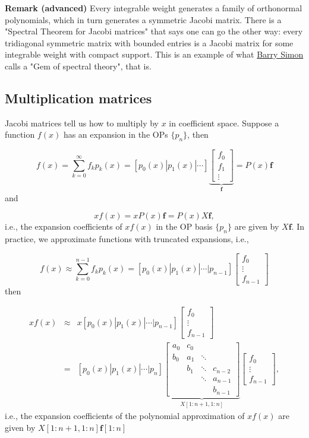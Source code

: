 \documentclass[12pt,a4paper]{article}
\begin{document}
\textbf{Remark (advanced)} Every integrable weight generates a family of orthonormal polynomials, which in turn generates a symmetric Jacobi matrix. There is a "Spectral Theorem for Jacobi matrices" that says one can go the other way: every tridiagonal symmetric matrix with bounded entries is a Jacobi matrix for some integrable weight with compact support. This is an example of what \href{https://en.wikipedia.org/wiki/Barry_Simon}{Barry Simon} calls a "Gem of spectral theory", that is.

\subsection{Multiplication matrices}
Jacobi matrices tell us how to multiply by $x$ in coefficient space.  Suppose a function $f(x)$ has an expansion in the OPs $\{ p_n \}$, then

\[
f(x) = \sum_{k = 0}^{\infty} f_k p_k(x) = [p_0(x) | p_1(x) | \ensuremath{\cdots}]\underbrace{\begin{bmatrix}
f_0 \\
f_1 \\
\vdots
\end{bmatrix}}_{\mathbf{f}} = P(x)\mathbf{f}
\]
and

\[
xf(x) = xP(x)\mathbf{f} = P(x) X\mathbf{f},
\]
i.e., the expansion coefficients of $xf(x)$ in the OP basis $\{ p_n \}$ are given by $X\mathbf{f}$.  In practice, we approximate functions with truncated expansions, i.e.,

\[
f(x) \approx \sum_{k = 0}^{n-1} f_k p_k(x) = [p_0(x) | p_1(x) | \ensuremath{\cdots} | p_{n-1}]\begin{bmatrix}
f_0 \\
\vdots \\
f_{n-1}
\end{bmatrix}
\]
then


\begin{eqnarray*}
xf(x) & \approx & x[p_0(x) | p_1(x) | \ensuremath{\cdots} | p_{n-1}]\begin{bmatrix}
f_0 \\
\vdots \\
f_{n-1}
\end{bmatrix}  \\
&=& [p_0(x) | p_1(x) | \ensuremath{\cdots} | p_{n}]
\underbrace{\begin{bmatrix}
a_0  & c_0  &     &      \\
b_0  & a_1  & \ddots    &       \\
     & b_1  & \ddots & c_{n-2}   \\
     &      & \ddots & a_{n-1}    \\
     &      &        & b_{n-1} 
\end{bmatrix}}_{X[1:n+1,1:n]}
\begin{bmatrix}
f_0 \\
\vdots \\
f_{n-1}
\end{bmatrix} ,
\end{eqnarray*}
i.e., the expansion coefficients of the polynomial approximation of $xf(x)$ are given by $X[1\!\!:\!n+1,1\!\!:\!n]\mathbf{f}[1\!\!:\!n]$
\end{document}
